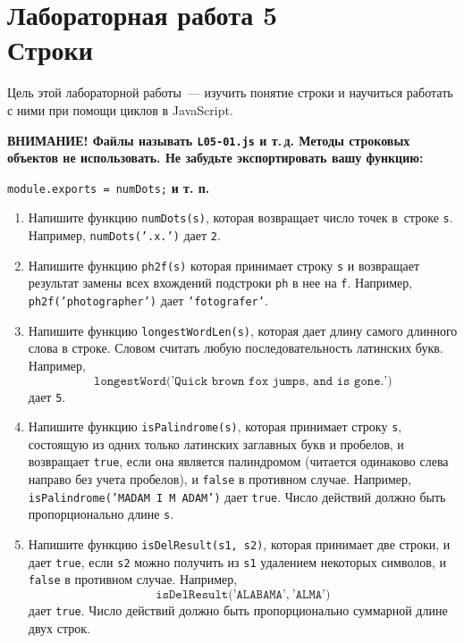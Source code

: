 \documentclass{article}
\begin{document}
\abovedisplayskip=5pt
\belowdisplayskip=3pt
\sloppy

\section*{{\normalsize Лабораторная работа 5} \\Строки}

Цель этой лабораторной работы~--- изучить понятие строки и научиться работать с ними при помощи циклов в JavaScript. 

\bigskip
\noindent\textbf{ВНИМАНИЕ! Файлы называть \texttt{L05-01.js} и т.\,д. Методы строковых объектов не использовать. Не забудьте экспортировать вашу функцию:}\newline
\centerline{\texttt{module.exports = numDots;} \textbf{и т. п.}}

\begin{enumerate}
\item
Напишите функцию \texttt{numDots(s)}, которая возвращает число точек в~строке \texttt{s}.
Например, \texttt{numDots('.x.')} дает \texttt{2}.
\item
Напишите функцию \texttt{ph2f(s)} которая принимает строку \texttt{s} и возвращает результат замены всех вхождений подстроки \texttt{ph} в нее на \texttt{f}. Например, \texttt{ph2f('photographer')} дает \texttt{'fotografer'}.
\item
Напишите функцию \texttt{longestWordLen(s)}, которая дает длину самого длинного слова в строке. Словом считать любую последовательность латинских букв. Например, 
$$
\texttt{longestWord('Quick brown fox jumps, and is gone.')}
$$ 
дает \texttt{5}.
\item
Напишите функцию \texttt{isPalindrome(s)}, которая принимает строку \texttt{s}, состоящую из одних только латинских заглавных букв и пробелов, и возвращает \texttt{true}, если она является палиндромом (читается одинаково слева направо без учета пробелов), и \texttt{false} в противном случае. Например, \texttt{isPalindrome('MADAM I M ADAM')} дает \texttt{true}.  Число действий должно быть пропорционально длине \texttt{s}.
\item
Напишите функцию \texttt{isDelResult(s1, s2)}, которая принимает две строки, и дает \texttt{true}, если \texttt{s2} можно получить из \texttt{s1} удалением некоторых символов, и \texttt{false} в противном случае. Например, 
$$
\texttt{isDelResult('ALABAMA',}{~}\texttt{'ALMA')}
$$
дает \texttt{true}. Число действий должно быть пропорционально суммарной длине двух строк.
\end{enumerate}
\end{document}
